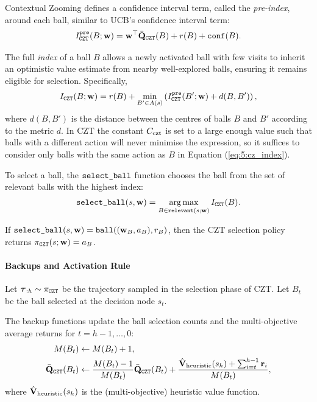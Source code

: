     Contextual Zooming defines a confidence interval term, called the \textit{pre-index}, around each ball, similar to UCB's confidence interval term:
    \begin{align}
        I^{\textnormal{\texttt{pre}}}_{\textnormal{\texttt{CZT}}}(B;\mathbf{w}) = \mathbf{w}^\top \bar{\mathbf{Q}}_{\textnormal{\texttt{CZT}}}(B) + r(B) + {\textnormal{\texttt{conf}}}(B). \label{eq:5:cz_pre_index}
    \end{align}

    The full \textit{index} of a ball $B$ allows a newly activated ball with few visits to inherit an optimistic value estimate from nearby well-explored balls, ensuring it remains eligible for selection. Specifically,
    \begin{align}
        I_{\textnormal{\texttt{CZT}}}(B;\mathbf{w}) = 
            r(B) + \min_{B'\in A(s)} \left( I^{\textnormal{\texttt{pre}}}_{\textnormal{\texttt{CZT}}}(B';\mathbf{w}) + d(B,B') \right), \label{eq:5:cz_index}
    \end{align}
    where $d(B,B')$ is the distance between the centres of balls $B$ and $B'$ according to the metric $d$. In CZT the constant $C_{\textnormal{czt}}$ is set to a large enough value such that balls with a different action will never minimise the expression, so it suffices to consider only balls with the same action as $B$ in Equation (\ref{eq:5:cz_index}).

    To select a ball, the $\textnormal{\texttt{select\_ball}}$ function chooses the ball from the set of relevant balls with the highest index:
    \begin{align}
        \textnormal{\texttt{select\_ball}}(s,\mathbf{w}) = \operatorname*{arg\,max}_{B\in{\textnormal{\texttt{relevant}}}(s;\mathbf{w})} I_{\textnormal{\texttt{CZT}}}(B).
    \end{align}

    If $\textnormal{\texttt{select\_ball}}(s,\mathbf{w}) = \textnormal{\texttt{ball}}((\mathbf{w}_B,a_B),r_B)$, then the CZT selection policy returns $\pi_{\textnormal{\texttt{CZT}}}(s;\mathbf{w})=a_B$.

\paragraph{Backups and Activation Rule}

    Let $\boldsymbol{\tau}_{:h}\sim\pi_{\textnormal{\texttt{CZT}}}$ be the trajectory sampled in the selection phase of CZT. Let $B_t$ be the ball selected at the decision node $s_t$. 

    The backup functions update the ball selection counts and the multi-objective average returns for $t=h-1,\ldots,0$:
    \begin{align}
        M(B_t) &\leftarrow M(B_t) + 1, \\
        \bar{\mathbf{Q}}_{\textnormal{\texttt{CZT}}}(B_t) &\leftarrow \frac{M(B_t)-1}{M(B_t)} \bar{\mathbf{Q}}_{\textnormal{\texttt{CZT}}}(B_t) + \frac{{\hat{\mathbf{V}}_{\textnormal{heuristic}}}(s_h) + \sum_{i=t}^{h-1} \mathbf{r}_i}{M(B_t)},
        \label{eq:5:czt_ball_backup}
    \end{align}
    where ${\hat{\mathbf{V}}_{\textnormal{heuristic}}}(s_h)$ is the (multi-objective) heuristic value function.

